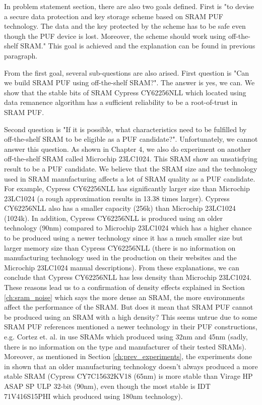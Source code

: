 In problem statement section, there are also two goals defined. First is "to devise a secure data protection and key storage scheme based on SRAM PUF technology. The data and the key protected by the scheme has to be safe even though the PUF device is lost. Moreover, the scheme should work using off-the-shelf SRAM." This goal is achieved and the explanation can be found in previous paragraph.

From the first goal, several sub-questions are also arised. First question is "Can we build SRAM PUF using off-the-shelf SRAM?". The answer is yes, we can. We show that the stable bits of SRAM Cypress CY62256NLL which located using data remanence algorithm has a sufficient reliability to be a root-of-trust in SRAM PUF.

Second question is "If it is possible, what characteristics need to be fulfilled by off-the-shelf SRAM to be eligible as a PUF candidate?". Unfortunately, we cannot answer this question. As shown in Chapter 4, we also do experiment on another off-the-shelf SRAM called Microchip 23LC1024. This SRAM show an unsatisfying result to be a PUF candidate. We believe that the SRAM size and the technology used in SRAM manufacturing affects a lot of SRAM quality as a PUF candidate. For example, Cypress CY62256NLL has significantly larger size than Microchip 23LC1024 (a rough approximation results in 13.38 times larger). Cypress CY62256NLL also has a smaller capacity (256k) than Microchip 23LC1024 (1024k). In addition, Cypress CY62256NLL is produced using an older technology (90nm) compared to Microchip 23LC1024 which has a higher chance to be produced using a newer technology since it has a much smaller size but larger memory size than Cypress CY62256NLL (there is no information on manufacturing technology used in the production on their websites and the Microchip 23LC1024 manual descriptions). From these explanations, we can conclude that Cypress CY62256NLL has less density than Microchip 23LC1024. These reasons lead us to a confirmation of density effects  explained in Section \ref{ch:sram_noise} which says the more dense an SRAM, the more environments affect the performance of the SRAM. But does it mean that SRAM PUF cannot be produced using an SRAM with a high density? This seems untrue due to some SRAM PUF references mentioned a newer technology in their PUF constructions, e.g. Cortez et. al. in \cite{7102498} use SRAMs which produced using 32nm and 45nm (sadly, there is no information on the type and manufacturer of their tested SRAMs). Moreover, as mentioned in Section \ref{ch:prev_experiments}, the experiments done in \cite{Schrijen:2012:CAS:2492708.2493033} shown that an older manufacturing technology doesn't always produced a more stable SRAM (Cypress CY7C15632KV18 (65nm) is more stable than Virage HP ASAP SP ULP 32-bit (90nm), even though the most stable is IDT 71V416S15PHI which produced using 180nm technology).
